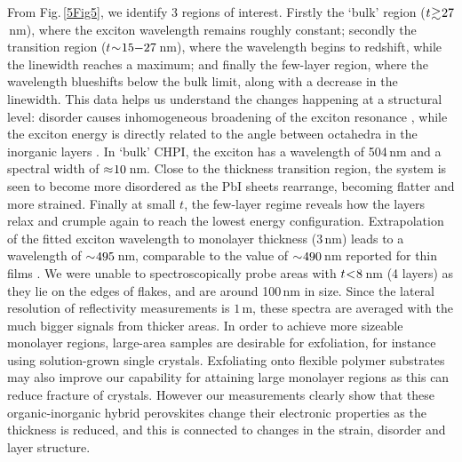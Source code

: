 From Fig.\,\ref{5Fig5}, we identify 3 regions of interest. Firstly the `bulk' region ($t\negmedspace\gtrsim\negmedspace27$\,nm), where the exciton wavelength remains roughly constant; secondly the transition region ($t\negmedspace\sim\negmedspace15\negmedspace-\negmedspace27$\,nm), where the wavelength begins to redshift, while the linewidth reaches a maximum; and finally the few-layer region, where the wavelength blueshifts below the bulk limit, along with a decrease in the linewidth. This data helps us understand the changes happening at a structural level: disorder causes inhomogeneous broadening of the exciton resonance \cite{Baranovskii1993, Andreani1998, Kuznetsova2010}, while the exciton energy is directly related to the angle between  octahedra in the inorganic layers \cite{Pradeesh2009}. In `bulk' CHPI, the exciton has a wavelength of 504\,nm and a spectral width of $\approx\negmedspace10$\,nm. Close to the thickness transition region, the system is seen to become more disordered as the PbI sheets rearrange, becoming flatter and more strained. Finally at small $t$, the few-layer regime reveals how the layers relax and crumple again to reach the lowest energy configuration. Extrapolation of the fitted exciton wavelength to monolayer thickness (3\,nm) leads to a wavelength of $\sim\negmedspace495$\,nm, comparable to the value of $\sim\negmedspace490$\,nm reported for  thin films \cite{Iwasaki1978, Goto1987}. We were unable to spectroscopically probe areas with $t\negmedspace<\negmedspace8$\,nm (4 layers) as they lie on the edges of flakes, and are around 100\,nm in size. Since the lateral resolution of reflectivity measurements is $1\,$\textmu m, these spectra are averaged with the much bigger signals from thicker areas. In order to achieve more sizeable monolayer regions, large-area samples are desirable for exfoliation, for instance using solution-grown single crystals. Exfoliating onto flexible polymer substrates may also improve our capability for attaining large monolayer regions as this can reduce fracture of crystals. However our measurements clearly show that these organic-inorganic hybrid perovskites change their electronic properties as the thickness is reduced, and this is connected to changes in the strain, disorder and layer structure.

